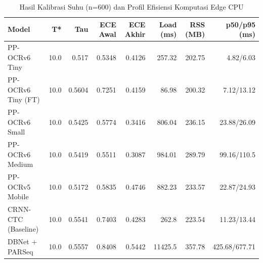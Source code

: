 \begin{table}[htbp]
\centering
\caption{Hasil Kalibrasi Suhu (n=600) dan Profil Efisiensi Komputasi Edge CPU}
\label{tab:kalibrasi_edge}
\begin{tabular}{lrrrrrrr}
\hline
Model & T* & Tau & ECE Awal & ECE Akhir & Load (ms) & RSS (MB) & p50/p95 (ms) \\
\hline
PP-OCRv6 Tiny & 10.0 & 0.517 & 0.5348 & 0.4126 & 257.32 & 202.75 & 4.82/6.03 \\
PP-OCRv6 Tiny (FT) & 10.0 & 0.5604 & 0.7251 & 0.4159 & 86.98 & 200.32 & 7.12/13.12 \\
PP-OCRv6 Small & 10.0 & 0.5425 & 0.5774 & 0.3416 & 806.04 & 236.15 & 23.88/26.09 \\
PP-OCRv6 Medium & 10.0 & 0.5419 & 0.5511 & 0.3087 & 984.01 & 289.79 & 99.16/110.5 \\
PP-OCRv5 Mobile & 10.0 & 0.5172 & 0.5835 & 0.4746 & 882.23 & 233.57 & 22.87/24.93 \\
CRNN-CTC (Baseline) & 10.0 & 0.5541 & 0.7403 & 0.4283 & 262.8 & 223.54 & 11.23/13.44 \\
DBNet + PARSeq & 10.0 & 0.5557 & 0.8408 & 0.5442 & 11425.5 & 357.78 & 425.68/677.71 \\
\hline
\end{tabular}
\end{table}
